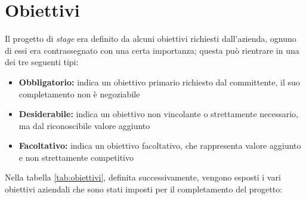 \newpage

\section{Obiettivi}\label{sec:objectives}\noindent
Il progetto di \textit{stage} era definito da alcuni obiettivi richiesti dall'azienda, ognuno di essi era contrassegnato con una certa importanza; questa può rientrare in una dei tre seguenti tipi:
\begin{itemize}
    \item \textbf{Obbligatorio:} indica un obiettivo primario richiesto dal committente, il suo completamento non è negoziabile
    \item \textbf{Desiderabile:} indica un obiettivo non vincolante o strettamente necessario, ma dal riconoscibile valore aggiunto
    \item \textbf{Facoltativo:} indica un obiettivo facoltativo, che rappresenta valore aggiunto e non strettamente competitivo
\end{itemize}
Nella tabella \ref{tab:obiettivi}, definita successivamente, vengono esposti i vari obiettivi aziendali che sono stati imposti per il completamento del progetto:
